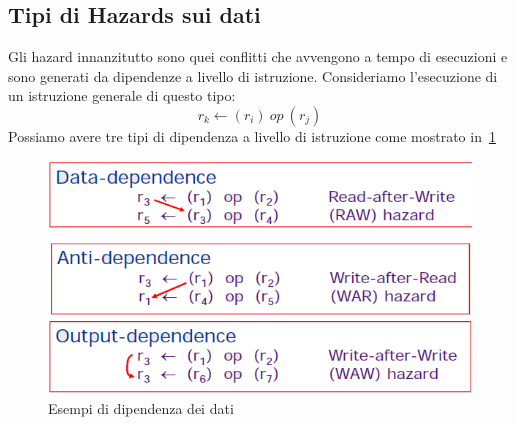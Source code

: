 \subsection{Tipi di Hazards sui dati}
Gli hazard innanzitutto sono quei conflitti che avvengono a tempo di esecuzioni e sono generati da dipendenze a livello di istruzione. Consideriamo l'esecuzione di un istruzione generale di questo tipo:
$$r_k \leftarrow (r_i) \ op \ (r_j)$$
Possiamo avere tre tipi di dipendenza a livello di istruzione come mostrato in \figurename\,\ref{fig:datadep}
\begin{figure}[htb]
\centering
\includegraphics[scale=0.4]{img/datadep.png}
\caption{Esempi di dipendenza dei dati}\label{fig:datadep}
\end{figure}
